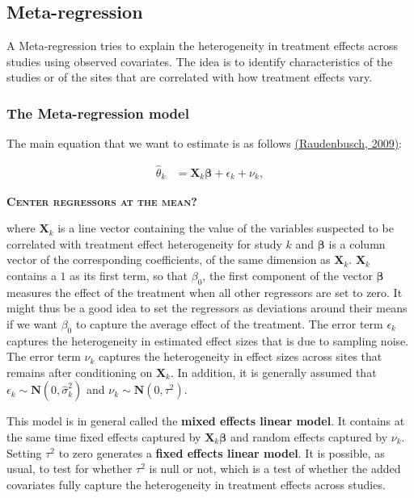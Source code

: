\documentclass[
]{book}
\theoremstyle{definition}
\theoremstyle{definition}
\theoremstyle{definition}
\theoremstyle{definition}
\theoremstyle{remark}
\begin{document}
\hypertarget{meta-regression}{%
\subsection{Meta-regression}\label{meta-regression}}

A Meta-regression tries to explain the heterogeneity in treatment effects across studies using observed covariates.
The idea is to identify characteristics of the studies or of the sites that are correlated with how treatment effects vary.

\hypertarget{the-meta-regression-model}{%
\subsubsection{The Meta-regression model}\label{the-meta-regression-model}}

The main equation that we want to estimate is as follows \href{https://www.jstor.org/stable/10.7758/9781610441384}{(Raudenbusch, 2009)}:

\begin{align}
  \hat{\theta}_k & = \mathbf{X}_k \mathbf{\beta}  + \epsilon_k + \nu_k,
\end{align}

\textbf{\textsc{Center regressors at the mean?}}

where \(\mathbf{X}_k\) is a line vector containing the value of the variables suspected to be correlated with treatment effect heterogeneity for study \(k\) and \(\mathbf{\beta}\) is a column vector of the corresponding coefficients, of the same dimension as \(\mathbf{X}_k\).
\(\mathbf{X}_k\) contains a \(1\) as its first term, so that \(\beta_0\), the first component of the vector \(\mathbf{\beta}\) measures the effect of the treatment when all other regressors are set to zero.
It might thus be a good idea to set the regressors as deviations around their means if we want \(\beta_0\) to capture the average effect of the treatment.
The error term \(\epsilon_k\) captures the heterogeneity in estimated effect sizes that is due to sampling noise.
The error term \(\nu_k\) captures the heterogeneity in effect sizes across sites that remains after conditioning on \(\mathbf{X}_k\).
In addition, it is generally assumed that \(\epsilon_k\sim\mathbf{N}(0,\hat{\sigma}^2_k)\) and \(\nu_k\sim\mathbf{N}(0,\tau^2)\).

This model is in general called the \textbf{mixed effects linear model}.
It contains at the same time fixed effects captured by \(\mathbf{X}_k \mathbf{\beta}\) and random effects captured by \(\nu_k\).
Setting \(\tau^2\) to zero generates a \textbf{fixed effects linear model}.
It is possible, as usual, to test for whether \(\tau^2\) is null or not, which is a test of whether the added covariates fully capture the heterogeneity in treatment effects across studies.
\end{document}
